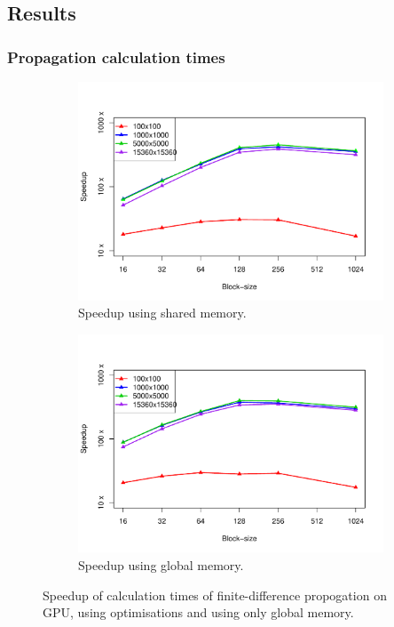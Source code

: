 \documentclass[12pt]{article}
\begin{document}
\subsection*{Results}
\subsubsection*{Propagation calculation times}
\begin{figure}
	\centering
	\begin{subfigure}{0.48\linewidth}
		\centering
		\includegraphics[width=0.75\linewidth]{../plots/fdcalc_shared.pdf}
		\caption{Speedup using shared memory.}
		\label{fig:1}
	\end{subfigure}\hfill
	\begin{subfigure}{0.48\linewidth}
		\centering
		\includegraphics[width=0.75\linewidth]{../plots/fdcalc_glob.pdf}
		\caption{Speedup using global memory.}
		\label{fig:2}
	\end{subfigure}
	\caption{Speedup of calculation times of finite-difference propogation on GPU, using optimisations and using only global memory.}
\end{figure}
\end{document}
